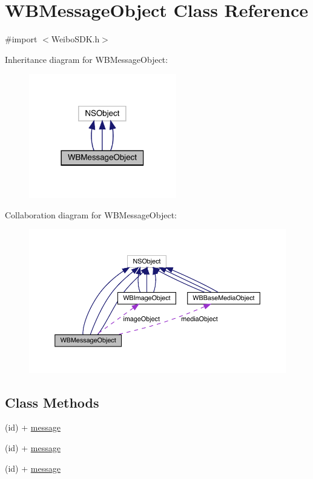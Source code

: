 \hypertarget{interface_w_b_message_object}{}\section{W\+B\+Message\+Object Class Reference}
\label{interface_w_b_message_object}


{\ttfamily \#import $<$Weibo\+S\+D\+K.\+h$>$}



Inheritance diagram for W\+B\+Message\+Object\+:\nopagebreak
\begin{figure}[H]
\begin{center}
\leavevmode
\includegraphics[width=182pt]{interface_w_b_message_object__inherit__graph}
\end{center}
\end{figure}


Collaboration diagram for W\+B\+Message\+Object\+:\nopagebreak
\begin{figure}[H]
\begin{center}
\leavevmode
\includegraphics[width=350pt]{interface_w_b_message_object__coll__graph}
\end{center}
\end{figure}
\subsection*{Class Methods}
\begin{DoxyCompactItemize}
\item 
(id) + \mbox{\hyperlink{interface_w_b_message_object_a653a30fc2b63ed605063309fdecb4d05}{message}}
\item 
(id) + \mbox{\hyperlink{interface_w_b_message_object_a653a30fc2b63ed605063309fdecb4d05}{message}}
\item 
(id) + \mbox{\hyperlink{interface_w_b_message_object_a653a30fc2b63ed605063309fdecb4d05}{message}}
\end{DoxyCompactItemize}
